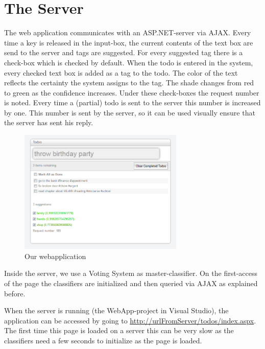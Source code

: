 \documentclass[a4paper,titlepage]{article}
\begin{document}
\section{The Server}
The web application communicates with an ASP.NET-server via AJAX. Every time a key is released in the input-box, the current contents of the text box are send to the server and tags are suggested. For every suggested tag there is a check-box which is checked by default. 
When the todo is entered in the system, every checked text box is added as a tag to the todo. The color of the text reflects the certainty the system assigns to the tag. The shade changes from red to green as the confidence increases. Under these check-boxes the request number is noted. Every time a (partial) todo is sent to the server this number is increased by one. This number is sent by the server, so it can be used visually ensure that the server has sent his reply.
\begin{figure} \centering \includegraphics[width=0.70\textwidth]{screenshot.PNG} \caption{Our webapplication} \end{figure}
Inside the server, we use a Voting System as master-classifier. On the first-access of the page the classifiers are initialized and then queried via AJAX as explained before. 

When the server is running (the WebApp-project in Visual Studio), the application can be accessed by going to \url{http://urlFromServer/todos/index.aspx}. The first time this page is loaded on a server this can be very slow as the classifiers need a few seconds to initialize as the page is loaded.
\end{document}

